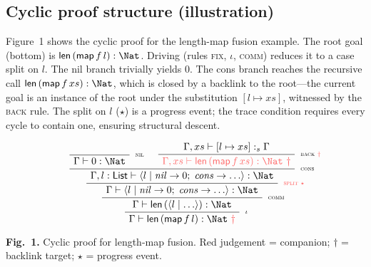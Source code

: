 \subsection{Cyclic proof structure (illustration)}
\label{sec:cyclic-diagram}

Figure~1 shows the cyclic proof for the length-map fusion example. The root goal (bottom) is $\mathsf{len}\,(\mathsf{map}\,f\,l) : \Nat$. Driving (rules \textsc{fix}, \textsc{$\iota$}, \textsc{comm}) reduces it to a case split on $l$. The nil branch trivially yields $0$. The cons branch reaches the recursive call $\mathsf{len}\,(\mathsf{map}\,f\,xs) : \Nat$, which is closed by a backlink to the root---the current goal is an instance of the root under the substitution $[l\mapsto xs]$, witnessed by the \textsc{back} rule. The split on $l$ ($\star$) is a progress event; the trace condition requires every cycle to contain one, ensuring structural descent.

\begin{center}
\footnotesize
\[
\AxiomC{}
\RightLabel{\;\fontsize{6}{7}\selectfont\textsc{nil}}
\UnaryInfC{$\Gamma \vdash 0 : \Nat$}
\qquad
\AxiomC{$\Gamma, xs \vdash [l\mapsto xs]:_s \Gamma$}
\RightLabel{\;\fontsize{6}{7}\selectfont\textsc{back} \textcolor{red!70}{\textdagger}}
\UnaryInfC{\textcolor{red!60}{$\Gamma, xs \vdash \mathsf{len}\,(\mathsf{map}\,f\,xs) : \Nat$ \textcolor{red!70}{\textdagger}}}
\RightLabel{\;\fontsize{6}{7}\selectfont\textsc{cons}}
\BinaryInfC{$\Gamma, l:\mathsf{List} \vdash \langle l \mid \mathit{nil}\to 0;\; \mathit{cons}\to\ldots \rangle : \Nat$}
\RightLabel{\;\fontsize{6}{7}\selectfont\textcolor{red!70}{\textsc{split} $\star$}}
\UnaryInfC{$\Gamma \vdash \langle l \mid \mathit{nil}\to 0;\; \mathit{cons}\to\ldots \rangle : \Nat$}
\RightLabel{\;\fontsize{6}{7}\selectfont\textsc{comm}}
\UnaryInfC{$\Gamma \vdash \mathsf{len}\,(\langle l \mid \ldots \rangle) : \Nat$}
\RightLabel{\;\fontsize{6}{7}\selectfont\textsc{$\iota$}}
\UnaryInfC{$\Gamma \vdash \mathsf{len}\,(\mathsf{map}\,f\,l) : \Nat$ \textcolor{red!70}{\textdagger}}
\RightLabel{\;\fontsize{6}{7}\selectfont\textsc{fix}}
\DisplayProof
\]

\vspace{-4pt}
{\fontsize{6}{7}\selectfont\textbf{Fig.\ 1.} Cyclic proof for length-map fusion. Red judgement = companion; $\dagger$ = backlink target; $\star$ = progress event.}
\end{center}
